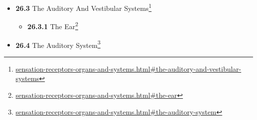\documentclass[
]{article}
\providecommand{\tightlist}{%
  \setlength{\itemsep}{0pt}\setlength{\parskip}{0pt}}
\providecommand{\tightlist}{%
  \setlength{\itemsep}{0pt}\setlength{\parskip}{0pt}}
\let\rmarkdownfootnote\footnote%
\def\footnote{\protect\rmarkdownfootnote}
\renewcommand{\href}[2]{#2\footnote{\url{#1}}}
\theoremstyle{definition}
\theoremstyle{definition}
\theoremstyle{definition}
\theoremstyle{remark}
\begin{document}
\begin{itemize}
\begin{itemize}
    \begin{itemize}
    \tightlist
    \item
      \href{sensation-receptors-organs-and-systems.html\#the-eye}{\emph{}\textbf{26.2.1}
      The Eye}
    \item
      \href{sensation-receptors-organs-and-systems.html\#the-retina}{\emph{}\textbf{26.2.2}
      The Retina}
    \item
      \href{sensation-receptors-organs-and-systems.html\#the-photoreceptors}{\emph{}\textbf{26.2.3}
      The Photoreceptors}
    \item
      \href{sensation-receptors-organs-and-systems.html\#visual-phototransduction}{\emph{}\textbf{26.2.4}
      Visual Phototransduction}
    \item
      \href{sensation-receptors-organs-and-systems.html\#the-visual-pathways}{\emph{}\textbf{26.2.5}
      The Visual Pathways}
    \item
      \href{sensation-receptors-organs-and-systems.html\#the-optic-nerve-and-optic-tract}{\emph{}\textbf{26.2.6}
      The Optic Nerve And Optic Tract}
    \item
      \href{sensation-receptors-organs-and-systems.html\#the-superior-colliculus}{\emph{}\textbf{26.2.7}
      The Superior Colliculus}
    \item
      \href{sensation-receptors-organs-and-systems.html\#the-lateral-geniculate-nucleus-lgn}{\emph{}\textbf{26.2.8}
      The Lateral Geniculate Nucleus (LGN)}
    \item
      \href{sensation-receptors-organs-and-systems.html\#the-visual-cortex}{\emph{}\textbf{26.2.9}
      The Visual Cortex}
    \end{itemize}
  \item
    \href{sensation-receptors-organs-and-systems.html\#the-auditory-and-vestibular-systems}{\emph{}\textbf{26.3}
    The Auditory And Vestibular Systems}

    \begin{itemize}
    \tightlist
    \item
      \href{sensation-receptors-organs-and-systems.html\#the-ear}{\emph{}\textbf{26.3.1}
      The Ear}
    \end{itemize}
  \item
    \href{sensation-receptors-organs-and-systems.html\#the-auditory-system}{\emph{}\textbf{26.4}
    The Auditory System}


\end{itemize}
\end{itemize}
\end{document}
